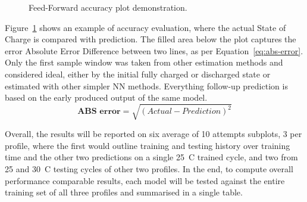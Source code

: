 %
%
 {
\begin{figure}[ht]
    \centering
    
    \caption{Feed-Forward accuracy plot demonstration.}
    \label{fig:plot_demo}
\end{figure}
Figure~\ref{fig:plot_demo} shows an example of accuracy evaluation, where the actual State of Charge is compared with prediction.
The filled area below the plot captures the error Absolute Error Difference between two lines, as per Equation~\ref{eq:abs-error}.
Only the first sample window was taken from other estimation methods and considered ideal, either by the initial fully charged or discharged state or estimated with other simpler NN methods.
Everything follow-up prediction is based on the early produced output of the same model.
\begin{equation}
    \textbf{ABS error}  = \sqrt{(Actual-Prediction)^2}
    \label{eq:abs-error}
\end{equation}
}
Overall, the results will be reported on six average of 10 attempts subplots, 3 per profile, where the first would outline training and testing history over training time and the other two predictions on a single 25~\textdegree{}C trained cycle, and two from 25 and 30~\textdegree{}C testing cycles of other two profiles.
In the end, to compute overall performance comparable results, each model will be tested against the entire training set of all three profiles and summarised in a single table.
